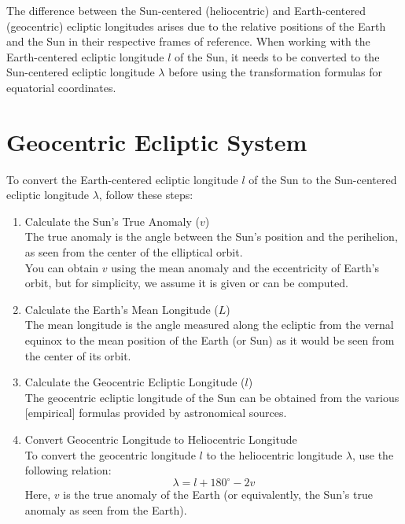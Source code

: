 \documentclass[12pt,a4paper]{article}
\begin{document}
	The difference between the Sun-centered (heliocentric) and Earth-centered (geocentric) ecliptic longitudes arises due to the relative positions of the Earth and the Sun in their respective frames of reference. When working with the Earth-centered ecliptic longitude \(l\) of the Sun, it needs to be converted to the Sun-centered ecliptic longitude \(\lambda\) before using the transformation formulas for equatorial coordinates.
	
	\section{Geocentric Ecliptic System}
	
	To convert the Earth-centered ecliptic longitude \(l\) of the Sun to the Sun-centered ecliptic longitude \(\lambda\), follow these steps:
	
	\begin{enumerate}
		\item Calculate the Sun's True Anomaly (\(v\)) \\
		The true anomaly is the angle between the Sun's position and the perihelion, as seen from the center of the elliptical orbit. \\
		You can obtain \(v\) using the mean anomaly and the eccentricity of Earth's orbit, but for simplicity, we assume it is given or can be computed.
		
		\item Calculate the Earth's Mean Longitude (\(L\)) \\
		The mean longitude is the angle measured along the ecliptic from the vernal equinox to the mean position of the Earth (or Sun) as it would be seen from the center of its orbit.
		
		\item Calculate the Geocentric Ecliptic Longitude (\(l\)) \\
		The geocentric ecliptic longitude of the Sun can be obtained from the various [empirical] formulas provided by astronomical sources.
		
		\item Convert Geocentric Longitude to Heliocentric Longitude \\
		To convert the geocentric longitude \(l\) to the heliocentric longitude \(\lambda\), use the following relation:
		\[
		\lambda = l + 180^\circ - 2v
		\]
		Here, \(v\) is the true anomaly of the Earth (or equivalently, the Sun's true anomaly as seen from the Earth).
	\end{enumerate}
	
\end{document}
